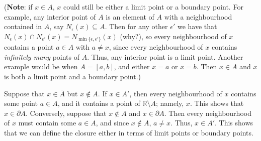 \documentclass[12pt,letterpaper]{article}
\newcommand{\R}{\mathbb{R}}
\begin{document}
\noindent ({\bf Note}: if $x\in A$, $x$ could still be either a limit point or a boundary point. For example, any interior point of $A$ is an element of $A$ with a neighbourhood contained in $A$, say $N_\epsilon(x)\subseteq A$. Then for any other $\epsilon'$ we have that $N_\epsilon(x)\cap N_{\epsilon'}(x) = N_{\min\{\epsilon,\epsilon'\}}(x)$ (why?), so every neighbourhood of $x$ contains a point $a\in A$ with $a\neq x$, since every neighbourhood of $x$ contains {\em infinitely many} points of $A$. Thus, any interior point is a limit point. Another example would be when $A=[a,b]$, and either $x=a$ or $x=b$. Then $x\in A$ and $x$ is both a limit point and a boundary point.)

Suppose that $x\in \overline{A}$ but $x\notin A$. If $x\in A'$, then every neighbourhood of $x$ contains some point $a\in A$, and it contains a point of $\R\setminus A$; namely, $x$. This shows that $x\in\partial A$. Conversely, suppose that $x\notin A$ and $x\in \partial A$. Then every neighbourhood of $x$ must contain some $a\in A$, and since $x\notin A$, $a\neq x$. Thus, $x\in A'$. This shows that we can define the closure either in terms of limit points or boundary points.
\end{document}
